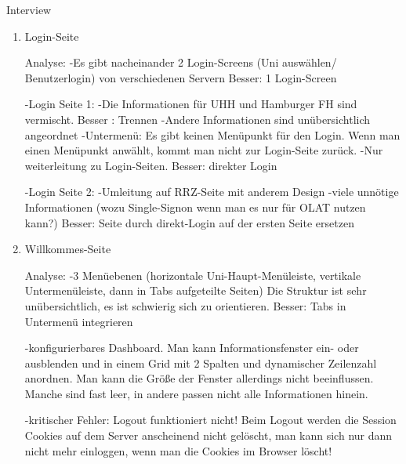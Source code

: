 \documentclass[a4paper,10pt]{article}
\begin{document}
\kopf
\renewcommand{\figurename}{Figure}

Interview

\begin{enumerate}
\item{Login-Seite}

Analyse:
-Es gibt nacheinander 2 Login-Screens (Uni auswählen/ Benutzerlogin) von verschiedenen Servern Besser: 1 Login-Screen

-Login Seite 1:
-Die Informationen für UHH und Hamburger FH sind vermischt. Besser : Trennen
-Andere Informationen sind unübersichtlich angeordnet
-Untermenü: Es gibt keinen Menüpunkt für den Login. Wenn man einen Menüpunkt anwählt, kommt man nicht zur Login-Seite zurück.
-Nur weiterleitung zu Login-Seiten. Besser: direkter Login

-Login Seite 2:
-Umleitung auf RRZ-Seite mit anderem Design
-viele unnötige Informationen (wozu Single-Signon wenn man es nur für OLAT nutzen kann?)
Besser: Seite durch direkt-Login auf der ersten Seite ersetzen



\item{Willkommes-Seite}

Analyse:
-3 Menüebenen (horizontale Uni-Haupt-Menüleiste, vertikale Untermenüleiste, dann in Tabs aufgeteilte Seiten)
 Die Struktur ist sehr unübersichtlich, es ist schwierig sich zu orientieren. Besser: Tabs in Untermenü integrieren

-konfigurierbares Dashboard. Man kann Informationsfenster ein- oder ausblenden und in einem Grid mit 2 Spalten und dynamischer Zeilenzahl anordnen.
 Man kann die Größe der Fenster allerdings nicht beeinflussen. Manche sind fast leer, in andere passen nicht alle Informationen hinein.
 
-kritischer Fehler: Logout funktioniert nicht! Beim Logout werden die Session Cookies auf dem Server anscheinend nicht gelöscht, man kann sich nur dann nicht    mehr einloggen, wenn man die Cookies im Browser löscht!
\end{enumerate}
\end{document}
